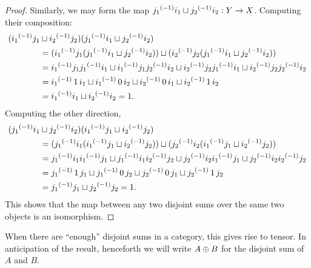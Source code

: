 \begin{proof}
  Similarly, we may form the map $\inv{\jay_1} i_1 \djoin \inv{\jay_2} i_2 : Y \to X$. Computing their composition:
  \begin{align*}
    (\inv{i_1} \jay_1 &\djoin \inv{i_2} \jay_2)(\inv{\jay_1} i_1 \djoin \inv{\jay_2} i_2)\\
      &= (\inv{i_1} \jay_1 (\inv{\jay_1} i_1 \djoin \inv{\jay_2} i_2))\djoin (\inv{i_2} \jay_2(\inv{\jay_1} i_1 \djoin \inv{\jay_2} i_2))\\
      &= \inv{i_1} \jay_1 \inv{\jay_1} i_1 \djoin \inv{i_1} \jay_1 \inv{\jay_2} i_2 \djoin \inv{i_2} \jay_2 \inv{\jay_1} i_1 \djoin \inv{i_2}
        \jay_2 \inv{\jay_2} i_2 \\
      &= \inv{i_1}\, 1\, i_1 \djoin \inv{i_1}\, 0\, i_2 \djoin \inv{i_2}\, 0\, i_1 \djoin \inv{i_2}\, 1\, i_2\\
      &= \inv{i_1} i_1 \djoin \inv{i_2} i_2 = 1.
  \end{align*}
  Computing the other direction,
  \begin{align*}
    (\inv{\jay_1} i_1 &\djoin \inv{\jay_2} i_2)(\inv{i_1} \jay_1 \djoin \inv{i_2} \jay_2)\\
      &= (\inv{\jay_1} i_1 (\inv{i_1} \jay_1 \djoin \inv{i_2} \jay_2) )\djoin (\inv{\jay_2} i_2(\inv{i_1} \jay_1 \djoin \inv{i_2} \jay_2))\\
      &= \inv{\jay_1} i_1 \inv{i_1} \jay_1 \djoin \inv{\jay_1} i_1 \inv{i_2} \jay_2 \djoin \inv{\jay_2} i_2 \inv{i_1} \jay_1
        \djoin \inv{\jay_2} i_2 \inv{i_2} \jay_2\\
      &= \inv{\jay_1}\, 1\, \jay_1 \djoin \inv{\jay_1}\, 0\, \jay_2 \djoin \inv{\jay_2}\, 0\, \jay_1 \djoin \inv{\jay_2}\, 1\, \jay_2\\
      &= \inv{\jay_1} \jay_1 \djoin \inv{\jay_2} \jay_2 = 1.\\
  \end{align*}
  This shows that the map between any two disjoint sums over the same two objects is an isomorphism.
\end{proof}


When there are ``enough'' disjoint sums in a category, this gives rise to tensor. In anticipation of the result, henceforth we will write $A\oplus B$
for the disjoint sum of $A$ and $B$.

